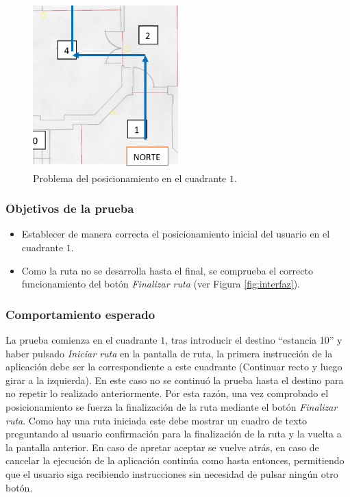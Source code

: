 \begin{figure}[t]
	\centering
	\includegraphics[width=0.5\textwidth]{Imagenes/Evaluacion/posic1}
	\caption{Problema del posicionamiento en el cuadrante $1$.}
	\label{fig:posic1}
\end{figure}

\subsubsection*{Objetivos de la prueba}

\begin{itemize}
	\item Establecer de manera correcta el posicionamiento inicial del usuario en el cuadrante $1$.
	
	\item Como la ruta no se desarrolla hasta el final, se comprueba el correcto funcionamiento del botón \textit{Finalizar ruta} (ver Figura \ref{fig:interfaz}).
\end{itemize}

\subsubsection*{Comportamiento esperado}

La prueba comienza en el cuadrante $1$, tras introducir el destino ``estancia 10'' y haber pulsado \textit{Iniciar ruta} en la pantalla de ruta, la primera instrucción de la aplicación debe ser la correspondiente a este cuadrante (Continuar recto y luego girar a la izquierda). En este caso no se continuó la prueba hasta el destino para no repetir lo realizado anteriormente. Por esta razón, una vez comprobado el posicionamiento se fuerza la finalización de la ruta mediante el botón \textit{Finalizar ruta}. Como hay una ruta iniciada este debe mostrar un cuadro de texto preguntando al usuario confirmación para la finalización de la ruta y la vuelta a la pantalla anterior. En caso de apretar aceptar se vuelve atrás, en caso de cancelar la ejecución de la aplicación continúa como hasta entonces, permitiendo que el usuario siga recibiendo instrucciones sin necesidad de pulsar ningún otro botón.


